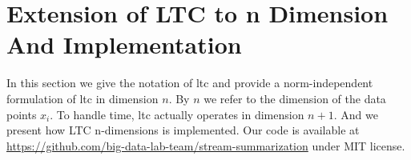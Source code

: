 \chapter{Extension of LTC to n Dimension And Implementation}
\label{chap:ltc-extension}

In this section we give the notation of \acrshort{ltc} and provide a
norm-independent formulation of \acrshort{ltc} in dimension $n$. By $n$ we refer
to the dimension of the data points $x_i$. To handle time, \acrshort{ltc}
actually operates in dimension $n+1$. And we present how LTC n-dimensions is
implemented. Our code is available at
\url{https://github.com/big-data-lab-team/stream-summarization} under MIT
license.





